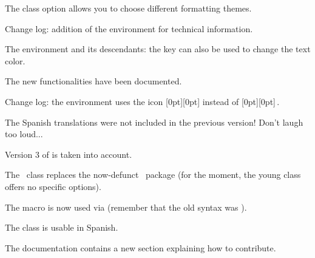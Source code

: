 \begin{tdocnew}
    \item The  class option allows you to choose different formatting themes.

    \item Change log: addition of the  environment for technical information.

    \item The  environment and its descendants: the  key can also be used to change the text color.

    \item The new functionalities have been documented.
\end{tdocnew}


\begin{tdocupdate}
    \item Change log: the  environment uses the icon
    \raisebox{0pt}[0pt][0pt]{}
    instead of
    \raisebox{0pt}[0pt][0pt]{\fbox{\faMagic}}\,.
\end{tdocupdate}


\begin{tdocfix}
    \item The Spanish translations were not included in the previous version! Don't laugh too loud...
\end{tdocfix}

\tdocsep




\begin{tdoctech}[version = 1.5.0, date = 2024-10-19]
    \item Version 3 of  is taken into account.
\end{tdoctech}


\begin{tdocbreak}
    \item The \thisproj\ class replaces the now-defunct \thisproj\ package (for the moment, the young class offers no specific options).

    \item The  macro is now used via  (remember that the old syntax was ).
\end{tdocbreak}


\begin{tdocnew}
    \item The class is usable in Spanish.

    \item The documentation contains a new section explaining how to contribute.
\end{tdocnew}


